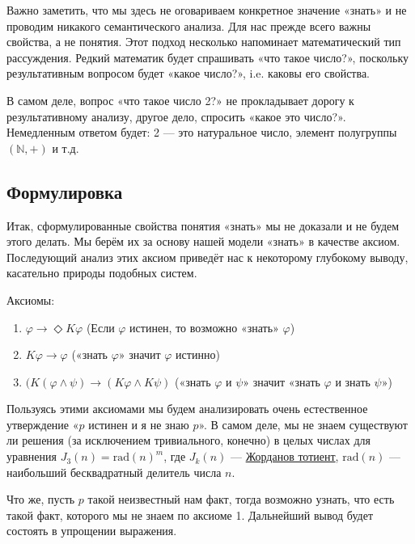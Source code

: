 \documentclass[openany]{book}
\theoremstyle{plain}
\theoremstyle{definition}
\begin{document}
Важно заметить, что мы здесь не оговариваем конкретное значение «знать» и не проводим никакого семантического анализа. Для нас прежде всего важны свойства, а не понятия. Этот подход несколько напоминает математический тип рассуждения. Редкий математик будет спрашивать «что такое число?», поскольку результативным вопросом будет «какое число?», i.e. каковы его свойства.

В самом деле, вопрос «что такое число 2?» не прокладывает дорогу к результативному анализу, другое дело, спросить «какое это число?». Немедленным ответом будет: 2 — это натуральное число, элемент полугруппы \((\mathbb{N}, +)\) и т.д.

\subsection{ Формулировка }

Итак, сформулированные свойства понятия «знать» мы не доказали и не будем этого делать. Мы берём их за основу нашей модели «знать» в качестве аксиом. Последующий анализ этих аксиом приведёт нас к некоторому глубокому выводу, касательно природы подобных систем.

Аксиомы:
\begin{enumerate}
    \item \(\varphi \to \Diamond K \varphi\) (Если \(\varphi\) истинен, то возможно «знать» \(\varphi\))
    \item \(K\varphi \to \varphi\) («знать \(\varphi\)» значит \(\varphi\) истинно)
    \item \((K(\varphi \land \psi) \to (K\varphi \land K\psi)\) («знать \(\varphi\) и \(\psi\)» значит «знать \(\varphi\) и знать \(\psi\)»)
\end{enumerate}

Пользуясь этими аксиомами мы будем анализировать очень естественное утверждение «\(p\) истинен и я не знаю \(p\)». В самом деле, мы не знаем существуют ли решения (за исключением тривиального, конечно) в целых числах для уравнения \(J_3(n) = \mathrm{rad}(n)^m\), где \(J_k(n)\) — \href{https://ru.wikipedia.org/wiki/Жорданов_тотиент}{Жорданов тотиент}, \(\mathrm{rad}(n)\) — наибольший бесквадратный делитель числа \(n\).

Что же, пусть \(p\) такой неизвестный нам факт, тогда возможно узнать, что есть такой факт, которого мы не знаем по аксиоме 1. Дальнейший вывод будет состоять в упрощении выражения.
\end{document}
